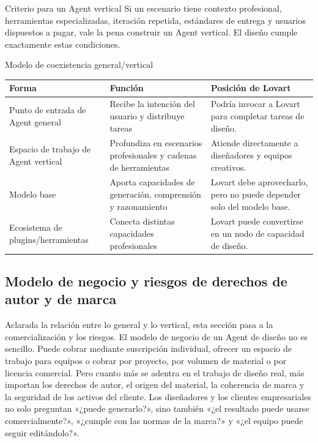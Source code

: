 \begin{importantbox}{Criterio para un Agent vertical}
Si un escenario tiene contexto profesional, herramientas especializadas, iteración repetida, estándares de entrega y usuarios dispuestos a pagar, vale la pena construir un Agent vertical. El diseño cumple exactamente estas condiciones.
\end{importantbox}

\begin{knowledgebox}{Modelo de coexistencia general/vertical}
\begin{tabularx}{\textwidth}{p{}p{}X}
\toprule
Forma & Función & Posición de Lovart \\
\midrule
Punto de entrada de Agent general & Recibe la intención del usuario y distribuye tareas & Podría invocar a Lovart para completar tareas de diseño. \\
Espacio de trabajo de Agent vertical & Profundiza en escenarios profesionales y cadenas de herramientas & Atiende directamente a diseñadores y equipos creativos. \\
Modelo base & Aporta capacidades de generación, comprensión y razonamiento & Lovart debe aprovecharlo, pero no puede depender solo del modelo base. \\
Ecosistema de plugins/herramientas & Conecta distintas capacidades profesionales & Lovart puede convertirse en un nodo de capacidad de diseño. \\
\bottomrule
\end{tabularx}
\end{knowledgebox}

\subsection{Modelo de negocio y riesgos de derechos de autor y de marca}

Aclarada la relación entre lo general y lo vertical, esta sección pasa a la comercialización y los riesgos. El modelo de negocio de un Agent de diseño no es sencillo. Puede cobrar mediante suscripción individual, ofrecer un espacio de trabajo para equipos o cobrar por proyecto, por volumen de material o por licencia comercial. Pero cuanto más se adentra en el trabajo de diseño real, más importan los derechos de autor, el origen del material, la coherencia de marca y la seguridad de los activos del cliente. Los diseñadores y los clientes empresariales no solo preguntan «¿puede generarlo?», sino también «¿el resultado puede usarse comercialmente?», «¿cumple con las normas de la marca?» y «¿el equipo puede seguir editándolo?».

